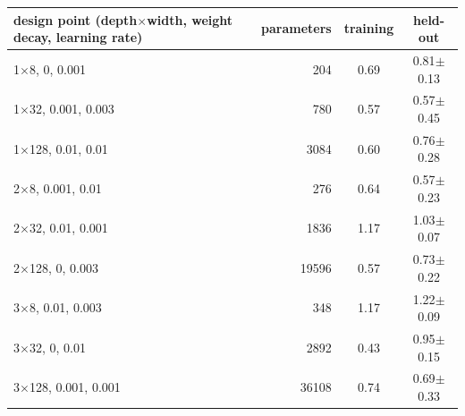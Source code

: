 \begin{tabular}{@{}lrcc@{}}
\toprule
design point (depth$\times$width, weight decay, learning rate) & parameters & training & held-out \\
\midrule
1$\times$8, 0, 0.001 & 204 & 0.69 & 0.81$\pm$0.13 \\
1$\times$32, 0.001, 0.003 & 780 & 0.57 & 0.57$\pm$0.45 \\
1$\times$128, 0.01, 0.01 & 3084 & 0.60 & 0.76$\pm$0.28 \\
2$\times$8, 0.001, 0.01 & 276 & 0.64 & 0.57$\pm$0.23 \\
2$\times$32, 0.01, 0.001 & 1836 & 1.17 & 1.03$\pm$0.07 \\
2$\times$128, 0, 0.003 & 19596 & 0.57 & 0.73$\pm$0.22 \\
3$\times$8, 0.01, 0.003 & 348 & 1.17 & 1.22$\pm$0.09 \\
3$\times$32, 0, 0.01 & 2892 & 0.43 & 0.95$\pm$0.15 \\
3$\times$128, 0.001, 0.001 & 36108 & 0.74 & 0.69$\pm$0.33 \\
\bottomrule
\end{tabular}
